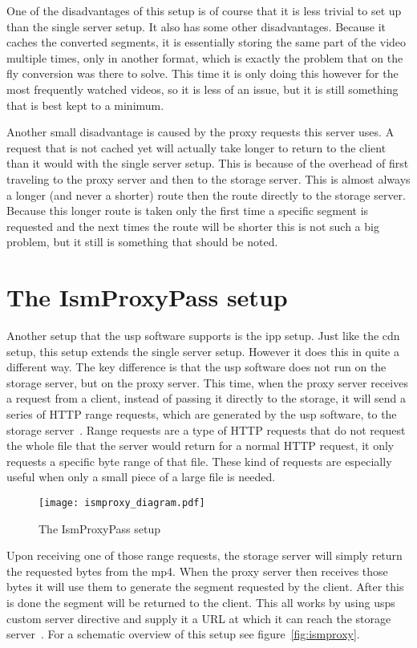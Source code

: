 \documentclass[twoside,openright]{uva-bachelor-thesis}
\begin{document}
One of the disadvantages of this setup is of course that it is less trivial to
set up than the single server setup. It also has some other disadvantages.
Because it caches the converted segments, it is essentially storing the same
part of the video multiple times, only in another format, which is exactly the
problem that on the fly conversion was there to solve. This time it is only
doing this however for the most frequently watched videos, so it is less of an
issue, but it is still something that is best kept to a minimum.

Another small disadvantage is caused by the proxy requests this server uses. A
request that is not cached yet will actually take longer to return to the
client than it would with the single server setup. This is because of the
overhead of first traveling to the proxy server and then to the storage server.
This is almost always a longer (and never a shorter) route then the route
directly to the storage server. Because this longer route is taken only the
first time a specific segment is requested and the next times the route will be
shorter this is not such a big problem, but it still is something that should be
noted.


\section{The IsmProxyPass setup}
Another setup that the \gls{usp} software supports is the \gls{ipp} setup. Just
like the \gls{cdn} setup, this setup extends the single server setup. However it
does this in quite a different way. The key difference is that the \gls{usp}
software does not run on the storage server, but on the proxy server. This
time, when the proxy server receives a request from a client, instead of passing
it directly to the storage, it will send a series of HTTP range requests, which
are generated by the \gls{usp} software, to the storage
server~\autocite{rangerequests}. Range requests are a type of HTTP requests that
do not request the whole file that the server would return for a normal HTTP
request, it only requests a specific byte range of that file.  These kind of
requests are especially useful when only a small piece of a large file is
needed.

\begin{figure}[h]
    \texttt{[image: ismproxy\_diagram.pdf]}
    \caption{The IsmProxyPass setup}\label{fig:ismproxy}
\end{figure}

Upon receiving one of those range requests, the storage server will simply
return the requested bytes from the mp4. When the proxy server then receives
those bytes it will use them to generate the segment requested by the client.
After this is done the segment will be returned to the client. This all works by
using \glspl{usp} custom \ipplong server directive and supply it a URL at
which it can reach the storage server~\autocites{uspismproxy}. For a schematic overview of this setup
see figure~\vref{fig:ismproxy}.
\end{document}
